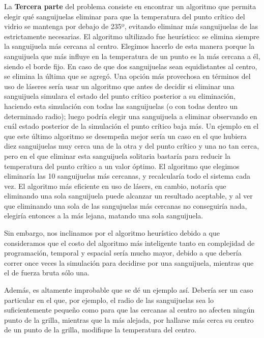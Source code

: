 \documentclass[a4paper]{article}
\begin{document}
La \textbf{Tercera parte} del problema consiste en encontrar un algoritmo que permita elegir qué sanguijuelas eliminar para que la temperatura del punto crítico del vidrio se mantenga por debajo de 235º, evitando eliminar más sanguijuelas de las estrictamente necesarias. El algoritmo ultilizado fue heurístico: se elimina siempre la sanguijuela más cercana al centro. Elegimos hacerlo de esta manera porque la sanguijuela que más influye en la temperatura de un punto es la más cercana a él, siendo el borde fijo. En caso de que dos sanguijuelas sean equidistantes al centro, se elimina la última que se agregó.\newline
Una opción más provechosa en términos del uso de láseres sería usar un algoritmo que antes de decidir si eliminar una sanguijuela simulara el estado del punto crítico posterior a su eliminación, haciendo esta simulación con todas las sanguijuelas (o con todas dentro un determinado radio); luego podría elegir una sanguijuela a eliminar observando en cuál estado posterior de la simulación el punto crítico baja más.
Un ejemplo en el que este último algoritmo se desempeña mejor sería un caso en el que hubiera diez sanguijuelas muy cerca una de la otra y del punto crítico y una no tan cerca, pero en el que eliminar esta sanguijuela solitaria bastaría para reducir la temperatura del punto crítico a un valor óptimo.
El algoritmo que elegimos eliminaría las 10 sanguijuelas más cercanas, y recalcularía todo el sistema cada vez.
El algoritmo más eficiente en uso de lásers, en cambio, notaría que eliminando una sola sanguijuela puede alcanzar un resultado aceptable, y al ver que eliminando una sola de las sangujuelas más cercanas no conseguiría nada, elegiría entonces a la más lejana, matando una sola sanguijuela.

Sin embargo, nos inclinamos por el algoritmo heurístico debido a que consideramos que el costo del algoritmo más inteligente tanto en complejidad de programación, temporal y espacial sería mucho mayor, debido a que debería correr once veces la simulación para decidirse por una sanguijuela, mientras que el de fuerza bruta sólo una. 

Además, es altamente improbable que se dé un ejemplo así. Debería ser un caso particular en el que, por ejemplo, el radio de las sanguijuelas sea lo suficientemente pequeño como para que las cercanas al centro no afecten ningún punto de la grilla, mientras que la más alejada, por hallarse más cerca su centro de un punto de la grilla, modifique la temperatura del centro.
\end{document}
